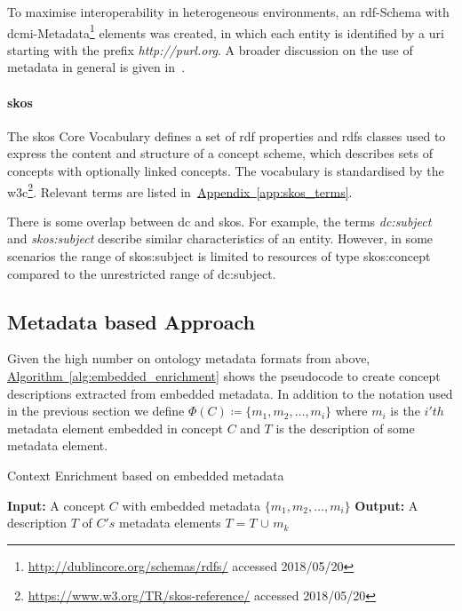 To maximise interoperability in heterogeneous environments, an \gls{rdf}-Schema with \gls{dcmi}-Metadata\footnote{\url{http://dublincore.org/schemas/rdfs/} accessed 2018/05/20} elements was created, in which each entity is identified by a \gls{uri} starting with the prefix \emph{http://purl.org}. A broader discussion on the use of metadata in general is given in~\cite{nilsson2010}.  

\paragraph{\gls{skos}}
The \gls{skos} Core Vocabulary \cite{skos2005} defines a set of \gls{rdf} properties and \gls{rdfs} classes
used to express the content and structure of a concept scheme, which describes sets of concepts with optionally linked concepts. The vocabulary is standardised by the \gls{w3c}\footnote{\url{https://www.w3.org/TR/skos-reference/} accessed 2018/05/20}. Relevant terms are listed in~\hyperref[app:skos_terms]{Appendix~\ref*{app:skos_terms}}.
	
There is some overlap between \gls{dc} and \gls{skos}. For example, the terms \textit{dc:subject} and \textit{skos:subject} describe similar characteristics of an entity. However, in some scenarios the range of skos:subject is limited to resources of type skos:concept compared to the unrestricted range of dc:subject. 


\subsection{Metadata based Approach}\label{sec:enrichment_metaData_approach}
Given the high number on ontology metadata formats from above, \hyperref[alg:embedded_enrichment]{Algorithm~\ref*{alg:embedded_enrichment}} shows the pseudocode to create concept descriptions extracted from embedded metadata. In addition to the notation used in the previous section we define $\Phi(C) \coloneqq \{m_1, m_2, \ldots, m_i \}$ where $m_i$ is the $i'th$ metadata element embedded in concept $C$ and $T$ is the description of some metadata element.

\begin{algorithm}
	\caption{Context Enrichment based on embedded metadata}\label{alg:embedded_enrichment}
	\begin{algorithmic}[1]
		\newline
			\textbf{Input:} A concept $C$ with embedded metadata $\{m_1, m_2, \ldots, m_i \}$\newline
			\textbf{Output:} A description $T$ of $C's$ metadata elements\newline
				\State $T=T$ $\cup$ $m_k$
			\EndFor
		\EndProcedure
	\end{algorithmic}
\end{algorithm}

